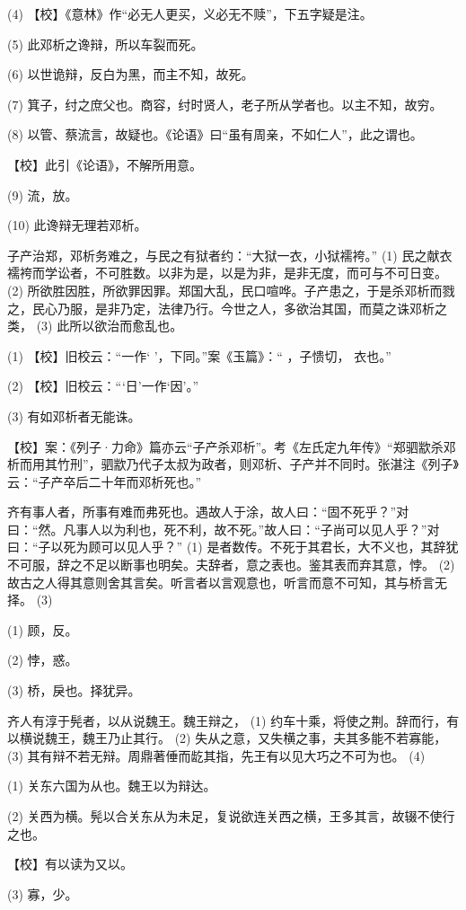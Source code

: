 \documentclass[12pt,UTF8]{ctexbook}
\begin{document}
(4) 【校】《意林》作“必无人更买，义必无不赎”，下五字疑是注。

(5) 此邓析之谗辩，所以车裂而死。

(6) 以世诡辩，反白为黑，而主不知，故死。

(7) 箕子，纣之庶父也。商容，纣时贤人，老子所从学者也。以主不知，故穷。

(8) 以管、蔡流言，故疑也。《论语》曰“虽有周亲，不如仁人”，此之谓也。

【校】此引《论语》，不解所用意。

(9) 流，放。

(10) 此谗辩无理若邓析。

子产治郑，邓析务难之，与民之有狱者约：“大狱一衣，小狱襦袴。” (1) 民之献衣襦袴而学讼者，不可胜数。以非为是，以是为非，是非无度，而可与不可日变。 (2) 所欲胜因胜，所欲罪因罪。郑国大乱，民口喧哗。子产患之，于是杀邓析而戮之，民心乃服，是非乃定，法律乃行。今世之人，多欲治其国，而莫之诛邓析之类， (3) 此所以欲治而愈乱也。

(1) 【校】旧校云：“一作‘ ’，下同。”案《玉篇》：“ ，子愦切， 衣也。”

(2) 【校】旧校云：“‘日’一作‘因’。”

(3) 有如邓析者无能诛。

【校】案：《列子·力命》篇亦云“子产杀邓析”。考《左氏定九年传》“郑驷歂杀邓析而用其竹刑”，驷歂乃代子太叔为政者，则邓析、子产并不同时。张湛注《列子》云：“子产卒后二十年而邓析死也。”

齐有事人者，所事有难而弗死也。遇故人于涂，故人曰：“固不死乎？”对曰：“然。凡事人以为利也，死不利，故不死。”故人曰：“子尚可以见人乎？”对曰：“子以死为顾可以见人乎？” (1) 是者数传。不死于其君长，大不义也，其辞犹不可服，辞之不足以断事也明矣。夫辞者，意之表也。鉴其表而弃其意，悖。 (2) 故古之人得其意则舍其言矣。听言者以言观意也，听言而意不可知，其与桥言无择。 (3)

(1) 顾，反。

(2) 悖，惑。

(3) 桥，戾也。择犹异。

齐人有淳于髡者，以从说魏王。魏王辩之， (1) 约车十乘，将使之荆。辞而行，有以横说魏王，魏王乃止其行。 (2) 失从之意，又失横之事，夫其多能不若寡能， (3) 其有辩不若无辩。周鼎著倕而龁其指，先王有以见大巧之不可为也。 (4)

(1) 关东六国为从也。魏王以为辩达。

(2) 关西为横。髡以合关东从为未足，复说欲连关西之横，王多其言，故辍不使行之也。

【校】有以读为又以。

(3) 寡，少。
\end{document}
